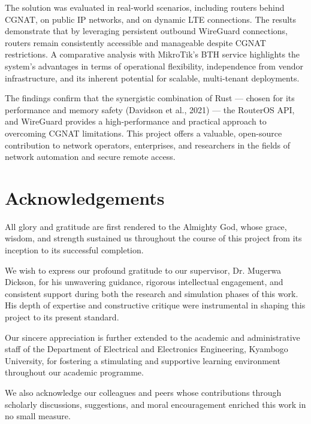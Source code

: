 \documentclass[12pt,a4paper,oneside]{report}
\begin{document}
The solution was evaluated in real-world scenarios, including routers behind CGNAT, on public IP networks, and on dynamic LTE connections. The results demonstrate that by leveraging persistent outbound WireGuard connections, routers remain consistently accessible and manageable despite CGNAT restrictions. A comparative analysis with MikroTik's BTH service highlights the system's advantages in terms of operational flexibility, independence from vendor infrastructure, and its inherent potential for scalable, multi-tenant deployments.

The findings confirm that the synergistic combination of Rust --- chosen for its performance and memory safety (Davidson et al., 2021) --- the RouterOS API, and WireGuard provides a high-performance and practical approach to overcoming CGNAT limitations. This project offers a valuable, open-source contribution to network operators, enterprises, and researchers in the fields of network automation and secure remote access.

\clearpage
\chapter*{Acknowledgements}

All glory and gratitude are first rendered to the Almighty God, whose grace, wisdom, and strength sustained us throughout the course of this project from its inception to its successful completion.

We wish to express our profound gratitude to our supervisor, Dr. Mugerwa Dickson, for his unwavering guidance, rigorous intellectual engagement, and consistent support during both the research and simulation phases of this work. His depth of expertise and constructive critique were instrumental in shaping this project to its present standard.

Our sincere appreciation is further extended to the academic and administrative staff of the Department of Electrical and Electronics Engineering, Kyambogo University, for fostering a stimulating and supportive learning environment throughout our academic programme.

We also acknowledge our colleagues and peers whose contributions through scholarly discussions, suggestions, and moral encouragement enriched this work in no small measure.
\end{document}
